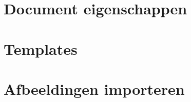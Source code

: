 \documentclass[t]{beamer}
\begin{document}
\begin{frame}
{\begin{columns}
\begin{column}[T]{0.4\textwidth}
				\end{column}
			\end{columns}
		}
	\end{frame}	
	\section{Document eigenschappen}



	\section{Templates}



	\section{Afbeeldingen importeren}
\end{document}
